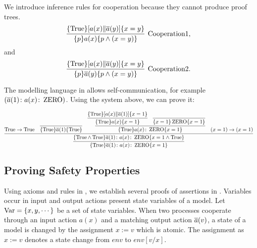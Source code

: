 \documentclass[12pt,a4paper,titlepage]{article}
\theoremstyle{break}
\begin{document}
We introduce inference rules for cooperation because they cannot produce proof trees. 
  \begin{displaymath}
\infer[\mbox{Cooperation1,}]{\{p\}a(x)\{p\wedge(x=y)\}}
                    {\{\Truerm\}[a(x)\|\bijection{a}(y)]\{x=y\}}
  \end{displaymath}
and
  \begin{displaymath}
\infer[\mbox{Cooperation2.}]{\{p\}\bijection{a}(y)\{p\wedge(x=y)\}}
                    {\{\Truerm\}[a(x)\|\bijection{a}(y)]\{x=y\}}
  \end{displaymath}

The modelling language in \NHK allows self-communication, for example \((\mbox{$\overline{a}$}(1)\colon a(x)\colon\mathop{\mathrm{ZERO}}\nolimits)\).
Using the system above, we can prove it:
  \begin{center}
    \begin{math}
\infer{\{\Truerm\}\bijection{a}(1)\colon a(x)\colon\ZERO\{x=1\}}
      {\infer{\{\Truerm\wedge\Truerm\}\bijection{a}(1)\colon a(x)\colon\ZERO\{x=1\wedge\Truerm\}}
             {\Truerm\rightarrow\Truerm&
              \infer{\{\Truerm\}\bijection{a}(1)\{\Truerm\}}{}&
              \infer{\{\Truerm\}a(x)\colon\ZERO\{x=1\}}
                    {\infer{\{\Truerm\}a(x)\{x=1\}}
                           {\{\Truerm\}[a(x)\|\bijection{a}(1)]\{x=1\}}&
                     \infer{\{x=1\}\ZERO\{x=1\}}{}}&
              (x=1)\rightarrow(x=1)}}
    \end{math}
  \end{center}
%
%
\subsection{Proving Safety Properties}
Using axioms and rules in , we establish several proofs of assertions in .
Variables occur in input and output actions present state variables of a model.
Let $\mathop{\mathrm{Var}}\nolimits=\{x,y, \cdots\}$ be a set of state variables. 
When two processes cooperate through an input action \(a(x)\) and a matching output action \(\mbox{$\overline{a}$}(v)\), a state of a model is changed by the assignment \(x:=v\) which is atomic.
The assignment as \(x:=v\) denotes a state change from \(env\) to \(env[v/x]\).
\end{document}
